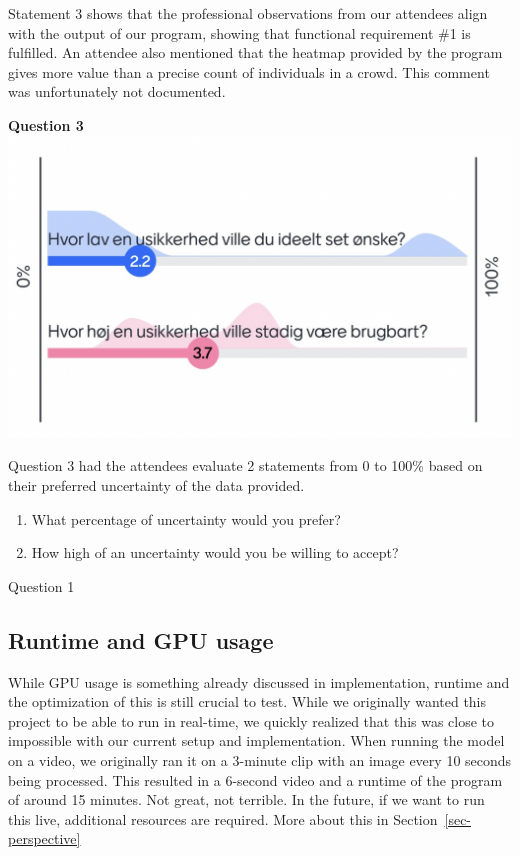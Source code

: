 \documentclass[
]{article}
\providecommand{\tightlist}{%
  \setlength{\itemsep}{0pt}\setlength{\parskip}{0pt}}\usepackage{longtable,booktabs,array}
\begin{document}
Statement 3 shows that the professional observations from our attendees
align with the output of our program, showing that functional
requirement \#1 is fulfilled. An attendee also mentioned that the
heatmap provided by the program gives more value than a precise count of
individuals in a crowd. This comment was unfortunately not documented.

\textbf{Question 3} \includegraphics{../images/Evaluation_question3.png}

Question 3 had the attendees evaluate 2 statements from 0 to 100\% based
on their preferred uncertainty of the data provided.

\begin{enumerate}
\def\labelenumi{\arabic{enumi}.}
\tightlist
\item
  What percentage of uncertainty would you prefer?
\item
  How high of an uncertainty would you be willing to accept?
\end{enumerate}

Question 1

\hypertarget{runtime-and-gpu-usage}{%
\subsection{Runtime and GPU usage}\label{runtime-and-gpu-usage}}

While GPU usage is something already discussed in implementation,
runtime and the optimization of this is still crucial to test. While we
originally wanted this project to be able to run in real-time, we
quickly realized that this was close to impossible with our current
setup and implementation. When running the model on a video, we
originally ran it on a 3-minute clip with an image every 10 seconds
being processed. This resulted in a 6-second video and a runtime of the
program of around 15 minutes. Not great, not terrible. In the future, if
we want to run this live, additional resources are required. More about
this in Section~\ref{sec-perspective}
\end{document}
